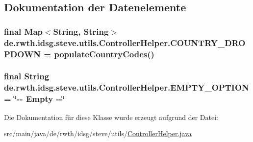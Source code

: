 \subsection{Dokumentation der Datenelemente}
\hypertarget{classde_1_1rwth_1_1idsg_1_1steve_1_1utils_1_1_controller_helper_a708225bcb0a143ff18ee9a73f51bc433}{
\subsubsection[{C\+O\+U\+N\+T\+R\+Y\+\_\+\+D\+R\+O\+P\+D\+O\+W\+N}]{\setlength{\rightskip}{0pt plus 5cm}final Map$<$String, String$>$ de.\+rwth.\+idsg.\+steve.\+utils.\+Controller\+Helper.\+C\+O\+U\+N\+T\+R\+Y\+\_\+\+D\+R\+O\+P\+D\+O\+W\+N = populate\+Country\+Codes()\hspace{0.3cm}{\ttfamily [static]}}}\label{classde_1_1rwth_1_1idsg_1_1steve_1_1utils_1_1_controller_helper_a708225bcb0a143ff18ee9a73f51bc433}
\hypertarget{classde_1_1rwth_1_1idsg_1_1steve_1_1utils_1_1_controller_helper_a109b68c4123f4c253f29673721e3382b}{
\subsubsection[{E\+M\+P\+T\+Y\+\_\+\+O\+P\+T\+I\+O\+N}]{\setlength{\rightskip}{0pt plus 5cm}final String de.\+rwth.\+idsg.\+steve.\+utils.\+Controller\+Helper.\+E\+M\+P\+T\+Y\+\_\+\+O\+P\+T\+I\+O\+N = \char`\"{}-\/-\/ Empty -\/-\/\char`\"{}\hspace{0.3cm}{\ttfamily [static]}}}\label{classde_1_1rwth_1_1idsg_1_1steve_1_1utils_1_1_controller_helper_a109b68c4123f4c253f29673721e3382b}


Die Dokumentation für diese Klasse wurde erzeugt aufgrund der Datei\+:\begin{DoxyCompactItemize}
\item 
src/main/java/de/rwth/idsg/steve/utils/\hyperlink{_controller_helper_8java}{Controller\+Helper.\+java}\end{DoxyCompactItemize}
